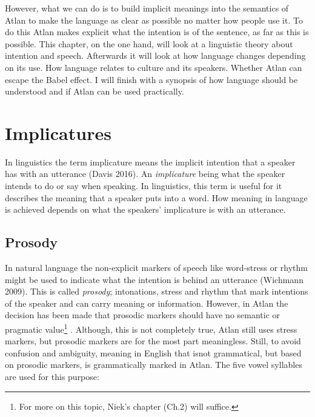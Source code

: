 However, what we can do is to build implicit meanings into the semantics of Atlan to make the language as clear as possible no matter how people use it. To do this Atlan makes explicit what the intention is of the sentence, as far as this is possible. This chapter, on the one hand, will look at a linguistic theory about intention and speech. Afterwards it will look at how language changes depending on its use. How language relates to culture and its speakers. Whether Atlan can escape the Babel effect. I will finish with a synopsis of how language should be understood and if Atlan can be used practically.  

\vspace{-0.5cm}
\section{Implicatures}

In linguistics the term implicature means the implicit intention that a speaker has with an utterance (Davis 2016). An {\it implicature} being what the speaker intends to do or say when speaking. In linguistics, this term is useful for it describes the meaning that a speaker puts into a word. How meaning in language is achieved depends on what the speakers' implicature is with an utterance.

\subsection{Prosody}

In natural language the non-explicit markers of speech like word-stress or rhythm might be used to indicate what the intention is behind an utterance (Wichmann 2009). This is called {\it prosody}; intonations, stress and rhythm that mark intentions of the speaker and can carry meaning or information. However, in Atlan the decision has been made that prosodic markers should have no semantic or pragmatic value\footnote{For more on this topic, Niek’s chapter (Ch.2) will suffice.} . Although, this is not completely true, Atlan still uses stress markers, but prosodic markers are for the most part meaningless. Still, to avoid confusion and ambiguity, meaning in English that isnot grammatical, but based on prosodic markers, is grammatically marked in Atlan. The five vowel syllables are used for this purpose:

